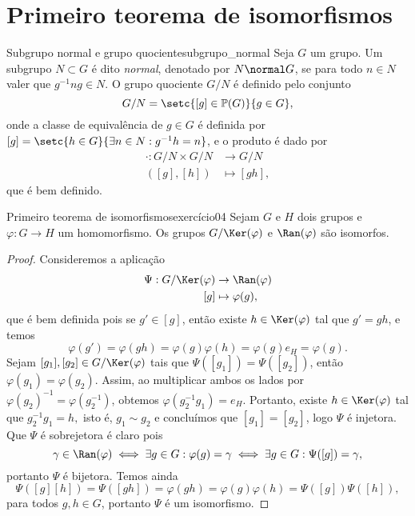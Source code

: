 \section{Primeiro teorema de isomorfismos}
\begin{definition}{Subgrupo normal e grupo quociente}{subgrupo_normal}
    Seja \(G\) um grupo. Um subgrupo \(N \subset G\) é dito \emph{normal}, denotado por \(N \normal G\), se para todo \(n \in N\) valer que \(g^{-1} n g \in N\). O grupo quociente \(G/N\) é definido pelo conjunto
    \begin{equation*}
        G / N = \setc{[g] \in \mathbb{P}(G)}{g \in G},
    \end{equation*}
    onde a classe de equivalência de \(g \in G\) é definida por \([g] = \setc{h \in G}{\exists n \in N : g^{-1}h = n}\), e o produto é dado por
    \begin{align*}
        \cdot : G/N \times G/N &\to G/N\\
                     ([g],[h]) &\mapsto [g h],
    \end{align*}
    que é bem definido.
\end{definition}
\begin{proposition}{Primeiro teorema de isomorfismos}{exercício04}
    Sejam \(G\) e \(H\) dois grupos e \(\varphi : G \to H\) um homomorfismo. Os grupos \(G/\Ker(\varphi)\) e \(\Ran(\varphi)\) são isomorfos.
\end{proposition}
\begin{proof}
    Consideremos a aplicação
    \begin{align*}
        \Psi : G/\Ker(\varphi) &\to \Ran(\varphi)\\
                           [g] &\mapsto \varphi(g),
    \end{align*}
    que é bem definida pois se \(g' \in [g]\), então existe \(h \in \Ker(\varphi)\) tal que \(g' = gh\), e temos
    \begin{equation*}
        \varphi(g') = \varphi(gh) = \varphi(g)\varphi(h) = \varphi(g)e_H = \varphi(g).
    \end{equation*}
    Sejam \([g_1], [g_2] \in G/\Ker(\varphi)\) tais que \(\Psi([g_1]) = \Psi([g_2])\), então \(\varphi(g_1) = \varphi(g_2)\). Assim, ao multiplicar ambos os lados por \(\varphi(g_2)^{-1} = \varphi(g_2^{-1})\), obtemos \(\varphi(g_2^{-1}g_1) = e_H\). Portanto, existe \(h \in \Ker(\varphi)\) tal que \(g_2^{-1}g_1 = h,\) isto é, \(g_1 \sim g_2\) e concluímos que \([g_1] = [g_2]\), logo \(\Psi\) é injetora. Que \(\Psi\) é sobrejetora é claro pois
    \begin{equation*}
        \gamma \in \Ran(\varphi) \iff \exists g \in G : \varphi(g) = \gamma \iff \exists g \in G : \Psi([g]) = \gamma,
    \end{equation*}
    portanto \(\Psi\) é bijetora. Temos ainda
    \begin{equation*}
        \Psi([g][h]) = \Psi([gh]) = \varphi(gh) = \varphi(g)\varphi(h) = \Psi([g])\Psi([h]),
    \end{equation*}
    para todos \(g, h \in G\), portanto \(\Psi\) é um isomorfismo.
\end{proof}
